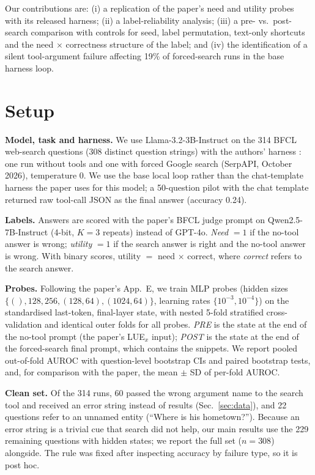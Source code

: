 \documentclass[10pt,twocolumn,a4paper]{article}
\newcommand{\LUE}{LUE$_x$}
\begin{document}
Our contributions are: (i) a replication of the paper's need and utility probes with its released harness; (ii) a label-reliability analysis; (iii) a pre- vs.\ post-search comparison with controls for seed, label permutation, text-only shortcuts and the need $\times$ correctness structure of the label; and (iv) the identification of a silent tool-argument failure affecting 19\% of forced-search runs in the base harness loop.

\section{Setup}
\textbf{Model, task and harness.} We use Llama-3.2-3B-Instruct on the 314 BFCL web-search questions (308 distinct question strings) with the authors' harness \citep{wu2026tocall}: one run without tools and one with forced Google search (SerpAPI, October 2026), temperature 0. We use the base local loop rather than the chat-template harness the paper uses for this model; a 50-question pilot with the chat template returned raw tool-call JSON as the final answer (accuracy 0.24).

\textbf{Labels.} Answers are scored with the paper's BFCL judge prompt on Qwen2.5-7B-Instruct (4-bit, $K = 3$ repeats) instead of GPT-4o. \emph{Need} $= 1$ if the no-tool answer is wrong; \emph{utility} $= 1$ if the search answer is right and the no-tool answer is wrong. With binary scores, utility $=$ need $\times$ correct, where \emph{correct} refers to the search answer.

\textbf{Probes.} Following the paper's App.~E, we train MLP probes (hidden sizes $\{(),128,256,(128,64),(1024,64)\}$, learning rates $\{10^{-3},10^{-4}\}$) on the standardised last-token, final-layer state, with nested 5-fold stratified cross-validation and identical outer folds for all probes. \emph{PRE} is the state at the end of the no-tool prompt (the paper's \LUE{} input); \emph{POST} is the state at the end of the forced-search final prompt, which contains the snippets. We report pooled out-of-fold AUROC with question-level bootstrap CIs and paired bootstrap tests, and, for comparison with the paper, the mean $\pm$ SD of per-fold AUROC.

\textbf{Clean set.} Of the 314 runs, 60 passed the wrong argument name to the search tool and received an error string instead of results (Sec.~\ref{sec:data}), and 22 questions refer to an unnamed entity (``Where is his hometown?''). Because an error string is a trivial cue that search did not help, our main results use the 229 remaining questions with hidden states; we report the full set ($n = 308$) alongside. The rule was fixed after inspecting accuracy by failure type, so it is post hoc.
\end{document}
